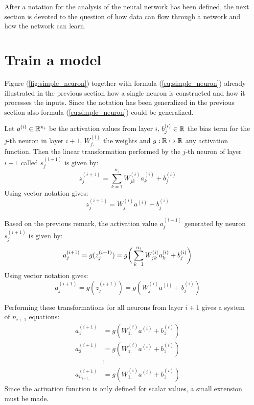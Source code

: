 After a notation for the analysis of the neural network has been defined, the next section is devoted to the question of how data can flow through a network and how the network can learn. 

\section{Train a model}

Figure (\ref{fig:simple_neuron}) together with formula (\ref{eq:simple_neuron}) already illustrated in the previous section how a single neuron is constructed and how it processes the inputs. Since the notation has been generalized in the previous section also formula (\ref{eq:simple_neuron}) could be generalized. 

\begin{remark}
	Let $a^{(i)} \in \mathbb{R}^{n_i}$ be the activation values from layer $i$, $b_j^{(i)} \in \mathbb{R}$ the bias term for the $j$-th neuron in layer $i+1$, $W_{j.}^{(i)}$ the weights and $g: \mathbb{R} \mapsto \mathbb{R}$ any activation function. Then the linear transformation performed by the $j$-th neuron of layer $i+1$ called $s_j^{(i+1)}$ is given by:
	\begin{equation}
		z_j^{(i+1)} = \sum_{k=1}^{n_i} W_{jk}^{(i)} a_k^{(i)} + b_j^{(i)}
	\end{equation}
	Using vector notation gives:
	\begin{equation}
		z_j^{(i+1)} = W_{j.}^{(i)} a^{(i)} + b_j^{(i)}
	\end{equation}	
\end{remark}

\begin{remark}
	Based on the previous remark, the activation value $a_j^{(i+1)}$ generated by neuron $s_j^{(i+1)}$ is given by: 
	\begin{equation}
		a_j^{(i+1)} = g(z_j^{(i+1)}) = g \bigg( \sum_{k=1}^{n_i} W_{jk}^{(i)} a_k^{(i)} + b_j^{(i)} \bigg) \\
	\end{equation}
	Using vector notation gives:
	\begin{equation}
		a_j^{(i+1)} = g(z_j^{(i+1)}) = g( W_{j.}^{(i)} a^{(i)} + b_j^{(i)} )
	\end{equation}	
\end{remark}

Performing these transformations for all neurons from layer $i+1$ gives a system of $n_{i+1}$ equations:
\begin{align*}
	a_1^{(i+1)} &= g( W_{1.}^{(i)} a^{(i)} + b_1^{(i)} ) 	\\
	a_2^{(i+1)} &= g( W_{1.}^{(i)} a^{(i)} + b_1^{(i)} ) 	\\
				&\vdots										\\	
	a_{n_{i+1}}^{(i+1)} &= g( W_{1.}^{(i)} a^{(i)} + b_1^{(i)} )
\end{align*}
Since the activation function is only defined for scalar values, a small extension must be made.

